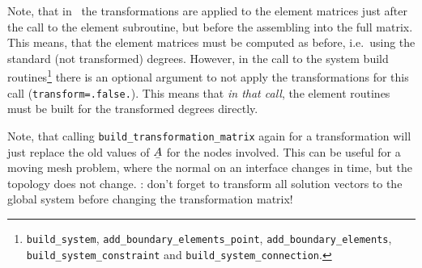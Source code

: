 Note, that in \tfem\ the transformations are applied to the element matrices
just after the call to the element subroutine, but before the assembling into
the full matrix. This means, that the element matrices must be computed as
before, i.e.\ using the standard (not transformed) degrees. However, in the call to the
system build routines\footnote{\texttt{build\_system}, \texttt{add\_boundary\_elements\_point}, 
\texttt{add\_boundary\_elements},
\texttt{build\_system\_constraint} and \texttt{build\_system\_connection}.} there is
an optional argument to not apply the transformations for this call
 (\texttt{transform=.false.}).
This means that \emph{in that call},
the element routines must be built for the transformed degrees directly.

Note, that calling \texttt{build\_transformation\_matrix} again for a transformation will just replace
the old values of $\mat A$ for the nodes involved. This can be useful for a moving mesh problem, where the normal
on an interface changes in time, but the topology does not change. : don't forget to transform all solution vectors to the
global system before changing the transformation matrix!

